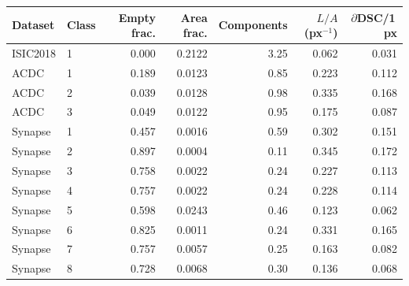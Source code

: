 \begin{tabular}{llrrrrr}
\toprule
Dataset & Class & Empty frac. & Area frac. & Components & $L/A$ (px$^{-1}$) & $\partial$DSC/1\,px \\
\midrule
ISIC2018 & 1 & 0.000 & 0.2122 & 3.25 & 0.062 & 0.031 \\
ACDC & 1 & 0.189 & 0.0123 & 0.85 & 0.223 & 0.112 \\
ACDC & 2 & 0.039 & 0.0128 & 0.98 & 0.335 & 0.168 \\
ACDC & 3 & 0.049 & 0.0122 & 0.95 & 0.175 & 0.087 \\
Synapse & 1 & 0.457 & 0.0016 & 0.59 & 0.302 & 0.151 \\
Synapse & 2 & 0.897 & 0.0004 & 0.11 & 0.345 & 0.172 \\
Synapse & 3 & 0.758 & 0.0022 & 0.24 & 0.227 & 0.113 \\
Synapse & 4 & 0.757 & 0.0022 & 0.24 & 0.228 & 0.114 \\
Synapse & 5 & 0.598 & 0.0243 & 0.46 & 0.123 & 0.062 \\
Synapse & 6 & 0.825 & 0.0011 & 0.24 & 0.331 & 0.165 \\
Synapse & 7 & 0.757 & 0.0057 & 0.25 & 0.163 & 0.082 \\
Synapse & 8 & 0.728 & 0.0068 & 0.30 & 0.136 & 0.068 \\
\bottomrule
\end{tabular}
